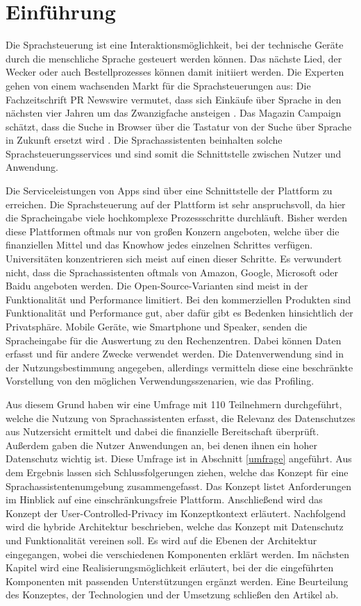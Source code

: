 \section{Einführung}
Die Sprachsteuerung ist eine Interaktionsmöglichkeit, bei der technische Geräte durch die menschliche Sprache gesteuert werden können. Das nächste Lied, der Wecker oder auch Bestellprozesses können damit initiiert werden.  Die Experten gehen von einem wachsenden Markt für die Sprachsteuerungen aus: Die Fachzeitschrift \glqq PR Newswire\grqq{} vermutet, dass sich Einkäufe über Sprache in den nächsten vier Jahren um das Zwanzigfache ansteigen \cite{prNewswire}. Das Magazin \glqq Campaign\grqq{} schätzt, dass die Suche in Browser über die Tastatur von der Suche über Sprache in Zukunft ersetzt wird \cite{Campaign}. Die Sprachassistenten beinhalten solche Sprachsteuerungsservices und sind somit die Schnittstelle zwischen Nutzer und Anwendung. \newline

Die Serviceleistungen von Apps sind über eine Schnittstelle der Plattform zu erreichen. Die Sprachsteuerung auf der Plattform ist sehr anspruchsvoll, da hier die Spracheingabe viele hochkomplexe Prozessschritte durchläuft. Bisher werden diese Plattformen oftmals nur von großen Konzern angeboten, welche über die finanziellen Mittel und das Knowhow jedes einzelnen Schrittes verfügen. Universitäten konzentrieren sich meist auf einen dieser Schritte. Es verwundert nicht, dass die Sprachassistenten oftmals von Amazon, Google, Microsoft oder Baidu angeboten werden. Die Open-Source-Varianten sind meist in der Funktionalität und Performance limitiert. Bei den kommerziellen Produkten sind Funktionalität und Performance gut, aber dafür gibt es Bedenken hinsichtlich der Privatsphäre. Mobile Geräte, wie Smartphone und Speaker, senden die Spracheingabe für die Auswertung zu den Rechenzentren. Dabei können Daten erfasst und für andere Zwecke verwendet werden. Die Datenverwendung sind in der Nutzungsbestimmung angegeben, allerdings vermitteln diese eine beschränkte Vorstellung von den möglichen Verwendungsszenarien, wie das Profiling. 

Aus diesem Grund haben wir eine Umfrage mit 110 Teilnehmern durchgeführt, welche die Nutzung von Sprachassistenten erfasst, die Relevanz des Datenschutzes aus Nutzersicht ermittelt und dabei die finanzielle Bereitschaft überprüft. Außerdem gaben die Nutzer Anwendungen an, bei denen ihnen ein hoher Datenschutz wichtig ist. Diese Umfrage ist in Abschnitt \ref{umfrage} angeführt. Aus dem Ergebnis lassen sich Schlussfolgerungen ziehen, welche das Konzept für eine Sprachassistentenumgebung zusammengefasst. Das Konzept listet Anforderungen im Hinblick auf eine einschränkungsfreie Plattform. Anschließend wird das Konzept der User-Controlled-Privacy im Konzeptkontext erläutert.
Nachfolgend wird die hybride Architektur beschrieben, welche das Konzept mit Datenschutz und Funktionalität vereinen soll. Es wird auf die Ebenen der Architektur eingegangen, wobei die verschiedenen Komponenten erklärt werden.
Im nächsten Kapitel wird eine Realisierungsmöglichkeit erläutert, bei der die eingeführten Komponenten mit passenden Unterstützungen ergänzt werden. 
Eine Beurteilung des Konzeptes, der Technologien und der Umsetzung schließen den Artikel ab.
